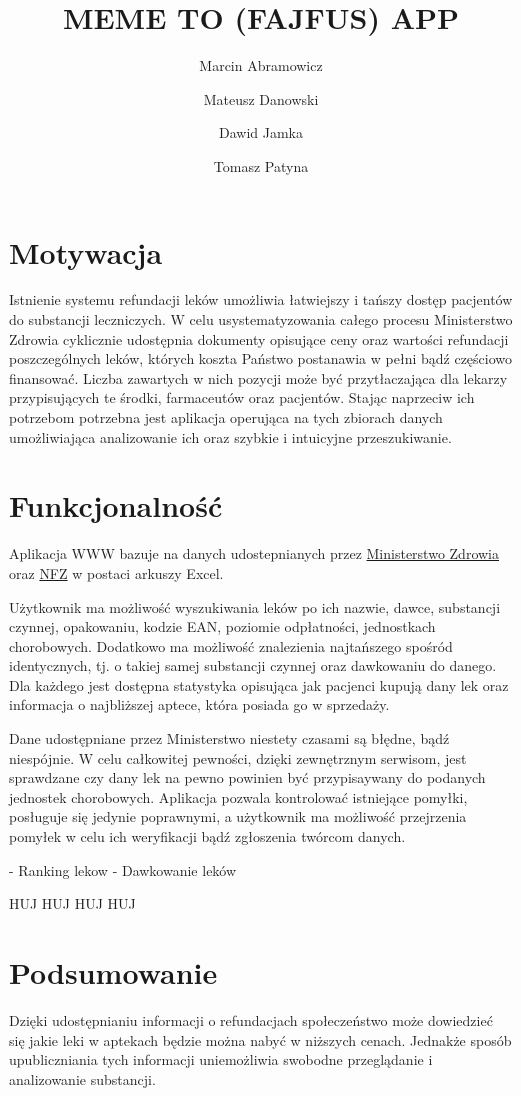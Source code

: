 \documentclass{article}
\title{MEME TO (FAJFUS) APP}
\author{Marcin Abramowicz \and Mateusz Danowski \and Dawid Jamka \and Tomasz Patyna}
\begin{document}
\maketitle


\section{Motywacja}

Istnienie systemu refundacji leków umożliwia łatwiejszy i tańszy dostęp pacjentów do substancji leczniczych. W celu usystematyzowania całego procesu Ministerstwo Zdrowia cyklicznie udostępnia dokumenty opisujące ceny oraz wartości refundacji poszczególnych leków, których koszta Państwo postanawia w pełni bądź częściowo finansować. Liczba zawartych w nich pozycji może być przytłaczająca dla lekarzy przypisujących te środki, farmaceutów oraz pacjentów. Stając naprzeciw ich potrzebom potrzebna jest aplikacja operująca na tych zbiorach danych umożliwiająca analizowanie ich oraz szybkie i intuicyjne przeszukiwanie.


\section{Funkcjonalność}

Aplikacja WWW bazuje na danych udostepnianych przez
\href{https://www.gov.pl/web/zdrowie/obwieszczenia-ministra-zdrowia-lista-lekow-refundowanych?fbclid=IwAR1U3YB3yON5EN2s1qdYRbcIeh7iDxqeOtQoEYGFvX9ozGDWdURIK2JOMRs}
{Ministerstwo Zdrowia}
oraz \href{https://www.nfz.gov.pl/aktualnosci/aktualnosci-centrali/komunikat-dgl,7465.html?fbclid=IwAR0F41XjLwTg7XQdUjeYpE_KS4VVZk50etlbYDpwxhxOR2ZLdslMatUtbEU}{NFZ}
w postaci arkuszy Excel.

Użytkownik ma możliwość wyszukiwania leków po ich nazwie, dawce, substancji czynnej, opakowaniu, kodzie EAN, poziomie odpłatności, jednostkach chorobowych. Dodatkowo ma możliwość znalezienia najtańszego spośród identycznych, tj. o takiej samej substancji czynnej oraz dawkowaniu do danego. Dla każdego jest dostępna statystyka opisująca jak pacjenci kupują dany lek oraz informacja o najbliższej aptece, która posiada go w sprzedaży. 

Dane udostępniane przez Ministerstwo niestety czasami są błędne, bądź niespójnie. W celu całkowitej pewności, dzięki zewnętrznym serwisom, jest sprawdzane czy dany lek na pewno powinien być przypisaywany do podanych jednostek chorobowych. Aplikacja pozwala kontrolować istniejące pomyłki, posługuje się jedynie poprawnymi, a użytkownik ma możliwość przejrzenia pomyłek w celu ich weryfikacji bądź zgłoszenia twórcom danych.


- Ranking lekow
- Dawkowanie leków

HUJ HUJ HUJ HUJ

\section{Podsumowanie}

Dzięki udostępnianiu informacji o refundacjach społeczeństwo może dowiedzieć się jakie leki w aptekach będzie można nabyć w niższych cenach. Jednakże sposób upubliczniania tych informacji uniemożliwia swobodne przeglądanie i analizowanie substancji.
\end{document}
